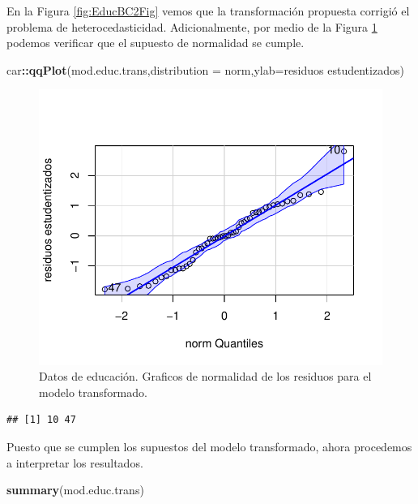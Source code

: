 \documentclass[
]{article}
\newenvironment{Shaded}{\begin{snugshade}}{\end{snugshade}}
\newcommand{\AttributeTok}[1]{\textcolor[rgb]{0.13,0.29,0.53}{#1}}
\newcommand{\FunctionTok}[1]{\textcolor[rgb]{0.13,0.29,0.53}{\textbf{#1}}}
\newcommand{\NormalTok}[1]{#1}
\newcommand{\SpecialCharTok}[1]{\textcolor[rgb]{0.81,0.36,0.00}{\textbf{#1}}}
\newcommand{\StringTok}[1]{\textcolor[rgb]{0.31,0.60,0.02}{#1}}
\begin{document}
En la Figura \ref{fig:EducBC2Fig} vemos que la transformación propuesta corrigió el problema de heterocedasticidad. Adicionalmente, por medio de la Figura \ref{fig:EducBC3Fig} podemos verificar que el supuesto de normalidad se cumple.

\begin{Shaded}
\begin{Highlighting}[]
\NormalTok{car}\SpecialCharTok{::}\FunctionTok{qqPlot}\NormalTok{(mod.educ.trans,}\AttributeTok{distribution =} \StringTok{\textquotesingle{}norm\textquotesingle{}}\NormalTok{,}\AttributeTok{ylab=}\StringTok{\textquotesingle{}residuos estudentizados\textquotesingle{}}\NormalTok{)}
\end{Highlighting}
\end{Shaded}

\begin{figure}

{\centering \includegraphics{MLG1_files/figure-latex/EducBC3Fig-1} 

}

\caption{Datos de educación. Graficos de normalidad de los residuos para el modelo transformado.}\label{fig:EducBC3Fig}
\end{figure}

\begin{verbatim}
## [1] 10 47
\end{verbatim}

Puesto que se cumplen los supuestos del modelo transformado, ahora procedemos a interpretar los resultados.

\begin{Shaded}
\begin{Highlighting}[]
\FunctionTok{summary}\NormalTok{(mod.educ.trans)}
\end{Highlighting}
\end{Shaded}
\end{document}
